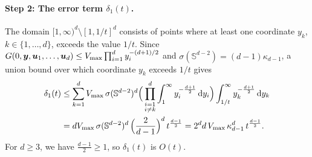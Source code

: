 \documentclass[11pt,a4paper]{article}
\theoremstyle{plain}
\theoremstyle{definition}
\theoremstyle{remark}
\newcommand{\dint}{\textup{d}}
\newcommand{\by}{\boldsymbol{y}}
\newcommand{\bu}{\boldsymbol{u}}
\def\SS{\mathbb{S}}
\begin{document}
\paragraph{Step 2: The error term $\delta_1(t)$.} The domain $[1,\infty)^d \setminus [1,1/t]^d$ consists of points where at least one coordinate $y_k$, $k\in\{1,\ldots,d\}$, exceeds the value $1/t$. Since $G(0,\by,\bu_1,\dotsc,\bu_d) \le V_{\rm max} \prod_{i=1}^d y_i^{-(d+1)/2}$ and $\sigma(\SS^{d-2})=(d-1)\kappa_{d-1}$, a union bound over which coordinate $y_k$ exceeds $1/t$ gives
\begin{align*}
	\delta_1(t)
	 & \leq \sum_{k=1}^dV_{\rm max}\,\sigma(\SS^{d-2})^d\Big(\prod_{\substack{i=1        \\i\neq k}}^d\int_1^\infty y_i^{-\frac{d+1}{2}}\,\dint y_i\Big)\int_{1/t}^\infty y_k^{-\frac{d+1}{2}}\,\dint y_k \\
	 & = dV_{\rm max}\,\sigma(\SS^{d-2})^d\,\Big(\frac{2}{d-1}\Big)^d\,t^{\frac{d-1}{2}}
	= 2^dd\,V_{\rm max}\,\kappa_{d-1}^d\,t^{\frac{d-1}{2}}.
\end{align*}
For $d \ge 3$, we have $\frac{d-1}{2} \ge 1$, so $\delta_1(t)$ is $O(t)$.
\end{document}
